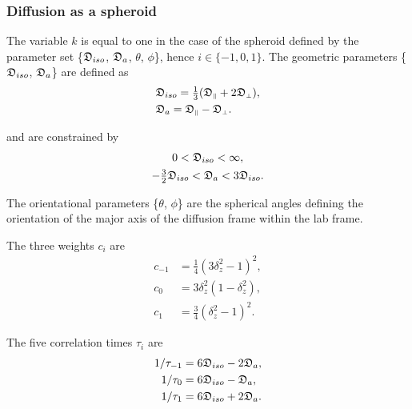 \begin{htmlonly}
\begin{htmlonly}
\subsubsection{Diffusion as a spheroid}

The variable $k$ is equal to one in the case of the spheroid defined by the parameter set \{$\mathfrak{D}_{iso}$, $\mathfrak{D}_a$, $\theta$, $\phi$\}, hence $i \in \{-1, 0, 1\}$.  The geometric parameters \{$\mathfrak{D}_{iso}$, $\mathfrak{D}_a$\} are defined as
\begin{subequations}
\begin{align}
    & \mathfrak{D}_{iso} = \tfrac{1}{3} (\mathfrak{D}_{\scriptscriptstyle \parallel} + 2\mathfrak{D}_{\scriptscriptstyle \perp}),   \label{eq: Diso spheroid def} \\
    & \mathfrak{D}_a = \mathfrak{D}_{\scriptscriptstyle \parallel} - \mathfrak{D}_{\scriptscriptstyle \perp}.                       \label{eq: Da spheroid def}
\end{align}
\end{subequations}

\noindent and are constrained by
\begin{subequations}
\begin{gather}
    0 < \mathfrak{D}_{iso} < \infty, \\
    -\tfrac{3}{2} \mathfrak{D}_{iso} < \mathfrak{D}_a < 3\mathfrak{D}_{iso}.
\end{gather}
\end{subequations}

\noindent The orientational parameters \{$\theta$, $\phi$\} are the spherical angles defining the orientation of the major axis of the diffusion frame within the lab frame.


The three weights $c_i$ are
\begin{subequations}
\begin{align}
    c_{-1} &= \tfrac{1}{4}(3\delta_z^2 - 1)^2, \label{eq: spheroid c-1} \\
    c_{0}  &= 3\delta_z^2(1 - \delta_z^2),     \label{eq: spheroid c0} \\
    c_{1}  &= \tfrac{3}{4}(\delta_z^2 - 1)^2.  \label{eq: spheroid c1}
\end{align}
\end{subequations}

The five correlation times $\tau_i$ are
\begin{subequations}
\begin{align}
    1/\tau_{-1} &= 6\mathfrak{D}_{iso} - 2\mathfrak{D}_a,    \label{eq: spheroid tau-1} \\
    1/\tau_{0}  &= 6\mathfrak{D}_{iso} - \mathfrak{D}_a,     \label{eq: spheroid tau0} \\
    1/\tau_{1}  &= 6\mathfrak{D}_{iso} + 2\mathfrak{D}_a.    \label{eq: spheroid tau1}
\end{align}
\end{subequations}




\end{htmlonly}
\end{htmlonly}
